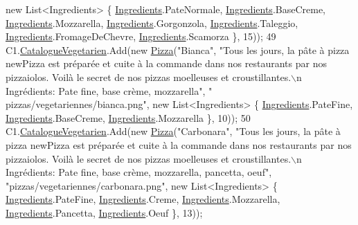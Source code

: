 \begin{DoxyCode}
{      new} List<Ingredients> \{ \hyperlink{namespaceModele_a001a8e89e56a724f24a249ba98080d41}{Ingredients}.PateNormale, \hyperlink{namespaceModele_a001a8e89e56a724f24a249ba98080d41}{Ingredients}.BaseCreme, 
      \hyperlink{namespaceModele_a001a8e89e56a724f24a249ba98080d41}{Ingredients}.Mozzarella, \hyperlink{namespaceModele_a001a8e89e56a724f24a249ba98080d41}{Ingredients}.Gorgonzola, 
      \hyperlink{namespaceModele_a001a8e89e56a724f24a249ba98080d41}{Ingredients}.Taleggio, \hyperlink{namespaceModele_a001a8e89e56a724f24a249ba98080d41}{Ingredients}.FromageDeChevre, 
      \hyperlink{namespaceModele_a001a8e89e56a724f24a249ba98080d41}{Ingredients}.Scamorza \}, 15));
49             C1.\hyperlink{classModele_1_1Catalogue_abd7d6d70ddd6ba264c1c91a5b084d9ba}{CatalogueVegetarien}.Add(\textcolor{keyword}{new} \hyperlink{classModele_1_1Pizza}{Pizza}(\textcolor{stringliteral}{"Bianca"}, \textcolor{stringliteral}{"Tous les jours, la pâte
       à pizza newPizza est préparée et cuite à la commande dans nos restaurants par nos pizzaiolos. Voilà le
       secret de nos pizzas moelleuses et croustillantes.\(\backslash\)n Ingrédients: Pate fine, base crème, mozzarella"}, \textcolor{stringliteral}{"
      pizzas/vegetariennes/bianca.png"}, \textcolor{keyword}{new} List<Ingredients> \{ \hyperlink{namespaceModele_a001a8e89e56a724f24a249ba98080d41}{Ingredients}.PateFine, 
      \hyperlink{namespaceModele_a001a8e89e56a724f24a249ba98080d41}{Ingredients}.BaseCreme, \hyperlink{namespaceModele_a001a8e89e56a724f24a249ba98080d41}{Ingredients}.Mozzarella \}, 10));
50             C1.\hyperlink{classModele_1_1Catalogue_abd7d6d70ddd6ba264c1c91a5b084d9ba}{CatalogueVegetarien}.Add(\textcolor{keyword}{new} \hyperlink{classModele_1_1Pizza}{Pizza}(\textcolor{stringliteral}{"Carbonara"}, \textcolor{stringliteral}{"Tous les jours, la
       pâte à pizza newPizza est préparée et cuite à la commande dans nos restaurants par nos pizzaiolos. Voilà le
       secret de nos pizzas moelleuses et croustillantes.\(\backslash\)n Ingrédients: Pate fine, base crème, mozzarella,
       pancetta, oeuf"}, \textcolor{stringliteral}{"pizzas/vegetariennes/carbonara.png"}, \textcolor{keyword}{new} List<Ingredients> \{ 
      \hyperlink{namespaceModele_a001a8e89e56a724f24a249ba98080d41}{Ingredients}.PateFine, \hyperlink{namespaceModele_a001a8e89e56a724f24a249ba98080d41}{Ingredients}.Creme, \hyperlink{namespaceModele_a001a8e89e56a724f24a249ba98080d41}{Ingredients}.Mozzarella, 
      \hyperlink{namespaceModele_a001a8e89e56a724f24a249ba98080d41}{Ingredients}.Pancetta, \hyperlink{namespaceModele_a001a8e89e56a724f24a249ba98080d41}{Ingredients}.Oeuf \}, 13));

\end{DoxyCode}
